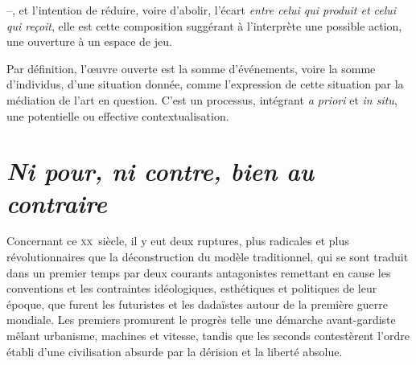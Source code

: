 --, et l'intention de réduire, voire d'abolir, l'écart \textit{entre celui qui produit et celui qui reçoit}, elle est cette composition suggérant à l'interprète une possible action, une ouverture à un espace de jeu. 

Par définition, l'œuvre ouverte est la somme d'événements, voire la somme d'individus, d'une situation donnée, comme l'expression de cette situation par la médiation de l'art en question. C'est un processus, intégrant \textit{a priori} et \textit{in situ}, une potentielle ou effective contextualisation.

\section*{\textit{Ni pour, ni contre, bien au contraire}}
\label{nini}

Concernant ce \textsc{xx}\ieme ~siècle, il y eut deux ruptures, plus radicales et plus révolutionnaires que la déconstruction du modèle traditionnel, qui se sont traduit dans un premier temps par deux courants antagonistes remettant en cause les conventions et les contraintes idéologiques, esthétiques et politiques de leur époque, que furent les futuristes et les dadaïstes autour de la première guerre mondiale. Les premiers promurent le progrès telle une démarche avant-gardiste mêlant urbanisme, machines et vitesse, tandis que les seconds contestèrent l'ordre établi d'une civilisation absurde par la dérision et la liberté absolue. 


